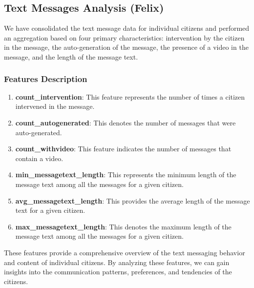 \documentclass[12pt]{article}
\begin{document}

\subsection{Text Messages Analysis (Felix)}

We have consolidated the text message data for individual citizens and performed an aggregation based on four primary characteristics: intervention by the citizen in the message, the auto-generation of the message, the presence of a video in the message, and the length of the message text.

\subsubsection{Features Description}

\begin{enumerate}
    \item \textbf{count\_intervention}: This feature represents the number of times a citizen intervened in the message.
    
    \item \textbf{count\_autogenerated}: This denotes the number of messages that were auto-generated.
    
    \item \textbf{count\_withvideo}: This feature indicates the number of messages that contain a video.
    
    \item \textbf{min\_messagetext\_length}: This represents the minimum length of the message text among all the messages for a given citizen.
    
    \item \textbf{avg\_messagetext\_length}: This provides the average length of the message text for a given citizen.
    
    \item \textbf{max\_messagetext\_length}: This denotes the maximum length of the message text among all the messages for a given citizen.
\end{enumerate}

These features provide a comprehensive overview of the text messaging behavior and content of individual citizens. By analyzing these features, we can gain insights into the communication patterns, preferences, and tendencies of the citizens.
\end{document}
